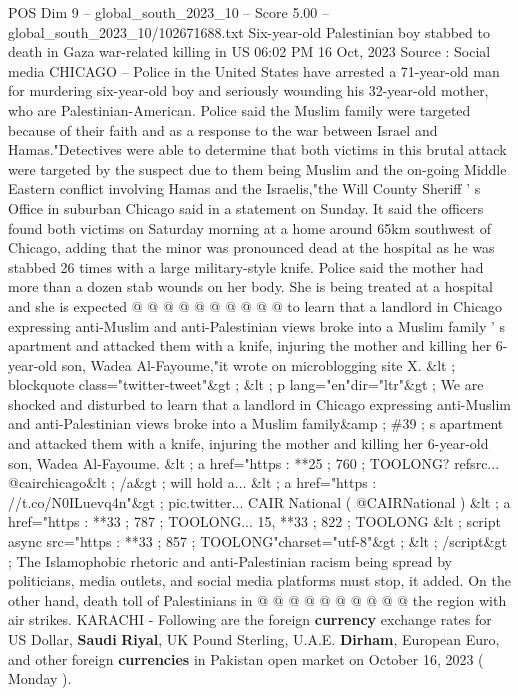 \begin{textsample}{POS Dim 9 – global\_south\_2023\_10 – Score 5.00 – global\_south\_2023\_10/102671688.txt}  \label{ex:f9_pos_083}
Six-year-old Palestinian boy stabbed to death in Gaza war-related killing in US 06:02 PM 16 Oct, 2023 Source : Social media CHICAGO -- Police in the United States have arrested a 71-year-old man for murdering six-year-old boy and seriously wounding his 32-year-old mother, who are Palestinian-American.
Police said the Muslim family were targeted because of their faith and as a response to the war between Israel and Hamas."Detectives were able to determine that both victims in this brutal attack were targeted by the suspect due to them being Muslim and the on-going Middle Eastern conflict involving Hamas and the Israelis,"the Will County Sheriff ' s Office in suburban Chicago said in a statement on Sunday.
It said the officers found both victims on Saturday morning at a home around 65km southwest of Chicago, adding that the minor was pronounced dead at the hospital as he was stabbed 26 times with a large military-style knife.
Police said the mother had more than a dozen stab wounds on her body.
She is being treated at a hospital and she is expected @ @ @ @ @ @ @ @ @ @ to learn that a landlord in Chicago expressing anti-Muslim and anti-Palestinian views broke into a Muslim family ' s apartment and attacked them with a knife, injuring the mother and killing her 6-year-old son, Wadea Al-Fayoume,"it wrote on microblogging site X. \&lt ; blockquote class="twitter-tweet"\&gt ; \&lt ; p lang="en"dir="ltr"\&gt ; We are shocked and disturbed to learn that a landlord in Chicago expressing anti-Muslim and anti-Palestinian views broke into a Muslim family\&amp ; \#39 ; s apartment and attacked them with a knife, injuring the mother and killing her 6-year-old son, Wadea Al-Fayoume. \&lt ; a href="https : **25 ; 760 ; TOOLONG? refsrc... @cairchicago\&lt ; /a\&gt ; will hold a... \&lt ; a href="https : //t.co/N0ILuevq4n"\&gt ; pic.twitter...
CAIR National ( @CAIRNational ) \&lt ; a href="https : **33 ; 787 ; TOOLONG... 15, **33 ; 822 ; TOOLONG \&lt ; script async src="https : **33 ; 857 ; TOOLONG"charset="utf-8"\&gt ; \&lt ; /script\&gt ; The Islamophobic rhetoric and anti-Palestinian racism being spread by politicians, media outlets, and social media platforms must stop, it added.
On the other hand, death toll of Palestinians in @ @ @ @ @ @ @ @ @ @ the region with air strikes.
KARACHI - Following are the foreign \textbf{currency} exchange rates for US Dollar, \textbf{Saudi} \textbf{Riyal}, UK Pound Sterling, U.A.E. \textbf{Dirham}, European Euro, and other foreign \textbf{currencies} in Pakistan open market on October 16, 2023 ( Monday ).

\end{textsample}
